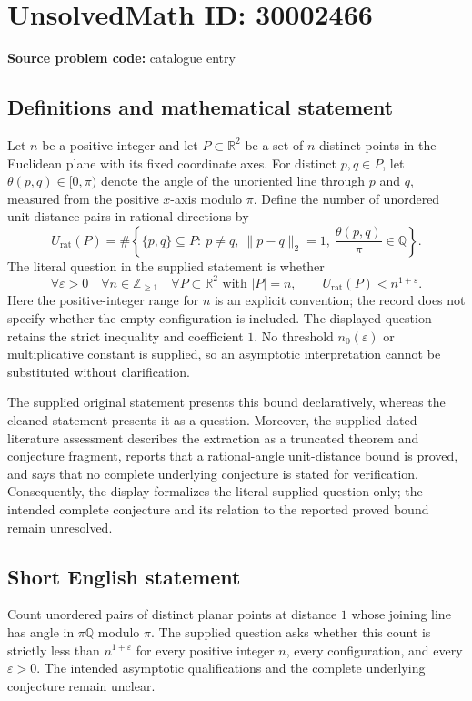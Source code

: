 \documentclass[11pt]{article}
\newcommand{\Z}{\mathbb{Z}}
\newcommand{\Q}{\mathbb{Q}}
\newcommand{\R}{\mathbb{R}}
\begin{document}
\section*{UnsolvedMath ID: 30002466}
\textbf{Source problem code:} catalogue entry
\subsection{Definitions and mathematical statement}
Let \(n\) be a positive integer and let \(P\subset\R^2\) be a set of \(n\) distinct points in the Euclidean plane with its fixed coordinate axes. For distinct \(p,q\in P\), let \(\theta(p,q)\in[0,\pi)\) denote the angle of the unoriented line through \(p\) and \(q\), measured from the positive \(x\)-axis modulo \(\pi\). Define the number of unordered unit-distance pairs in rational directions by
\[
U_{\mathrm{rat}}(P)=\#\left\{\{p,q\}\subseteq P:\ p\ne q,\ \lVert p-q\rVert_2=1,\ \frac{\theta(p,q)}{\pi}\in\Q\right\}.
\]
The literal question in the supplied statement is whether
\[
\forall\varepsilon>0\quad\forall n\in\Z_{\ge1}\quad\forall P\subset\R^2\text{ with }|P|=n,\qquad U_{\mathrm{rat}}(P)<n^{1+\varepsilon}.
\]
Here the positive-integer range for \(n\) is an explicit convention; the record does not specify whether the empty configuration is included. The displayed question retains the strict inequality and coefficient \(1\). No threshold \(n_0(\varepsilon)\) or multiplicative constant is supplied, so an asymptotic interpretation cannot be substituted without clarification.

The supplied original statement presents this bound declaratively, whereas the cleaned statement presents it as a question. Moreover, the supplied dated literature assessment describes the extraction as a truncated theorem and conjecture fragment, reports that a rational-angle unit-distance bound is proved, and says that no complete underlying conjecture is stated for verification. Consequently, the display formalizes the literal supplied question only; the intended complete conjecture and its relation to the reported proved bound remain unresolved.
\subsection{Short English statement}
Count unordered pairs of distinct planar points at distance \(1\) whose joining line has angle in \(\pi\Q\) modulo \(\pi\). The supplied question asks whether this count is strictly less than \(n^{1+\varepsilon}\) for every positive integer \(n\), every configuration, and every \(\varepsilon>0\). The intended asymptotic qualifications and the complete underlying conjecture remain unclear.
\end{document}
